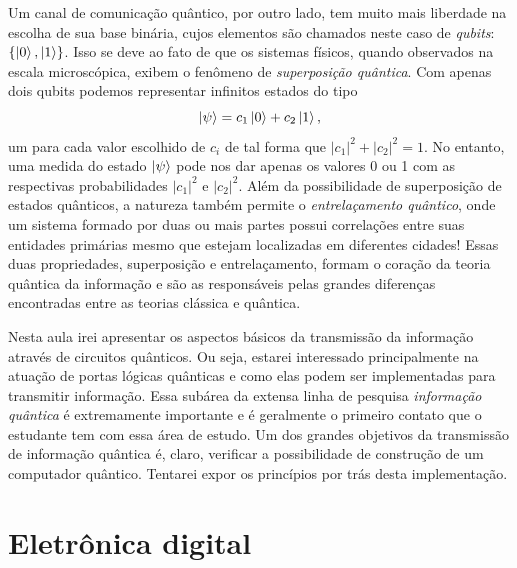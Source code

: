 \documentclass{article}
\begin{document}
Um canal de comunicação quântico, por outro lado, tem muito mais liberdade na escolha de sua base binária, cujos elementos são chamados neste caso de \textit{qubits}: $\{ \ket{0},\ket{1} \}$. Isso se deve ao fato de que os sistemas físicos, quando observados na escala microscópica, exibem o fenômeno de \textit{superposição quântica}. Com apenas dois qubits podemos representar infinitos estados do tipo 
\begin{equation}
    \ket{\psi} = c_1 \ket{0} + c_2 \ket{1},
\end{equation}
um para cada valor escolhido de $c_i$ de tal forma que $|c_1|^2 + |c_2|^2 = 1$. No entanto, uma medida do estado $\ket{\psi}$ pode nos dar apenas os valores 0 ou 1 com as respectivas probabilidades $|c_1|^2$ e $|c_2|^2$. Além da possibilidade de superposição de estados quânticos, a natureza também permite o \textit{entrelaçamento quântico}, onde um sistema formado por duas ou mais partes possui correlações entre suas entidades primárias mesmo que estejam localizadas em diferentes cidades! Essas duas propriedades, superposição e entrelaçamento, formam o coração da teoria quântica da informação e são as responsáveis pelas grandes diferenças encontradas entre as teorias clássica e quântica. 

Nesta aula irei apresentar os aspectos básicos da transmissão da informação através de circuitos quânticos. Ou seja, estarei interessado principalmente na atuação de portas lógicas quânticas e como elas podem ser implementadas para transmitir informação. Essa subárea da extensa linha de pesquisa \textit{informação quântica} é extremamente importante e é geralmente o primeiro contato que o estudante tem com essa área de estudo. Um dos grandes objetivos da transmissão de informação quântica é, claro, verificar a possibilidade de construção de um computador quântico. Tentarei expor os princípios por trás desta implementação. 


\section{Eletrônica digital}
\end{document}
